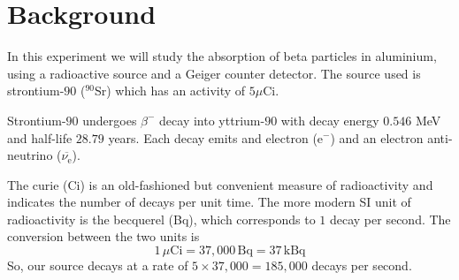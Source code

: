 \section{Background}%

In this experiment we will study the absorption of beta particles in aluminium, using a radioactive source and a Geiger counter detector. The source used is strontium-$90$ ($^{90}$Sr) which has an activity of $5 \mu$Ci. 

Strontium-$90$ undergoes $\beta^{-}$ decay into yttrium-$90$ with decay energy $0.546$ MeV and half-life $28.79$ years. Each decay emits and electron ($\mathrm{e}^-$) and an electron anti-neutrino ($\overbar{\nu_\mathrm{e}}$).

The curie (Ci) is an old-fashioned but convenient measure of radioactivity and indicates the number of decays per unit time. The more modern SI unit of radioactivity is the becquerel (Bq), which corresponds to $1$ decay per second. The conversion between the two units is 
\begin{displaymath}
  1\,\mu\textrm{Ci} = 37,000\,\textrm{Bq} = 37\,\textrm{kBq} 
\end{displaymath}
So, our source decays at a rate of $5\times37,000=185,000$ decays per second.

